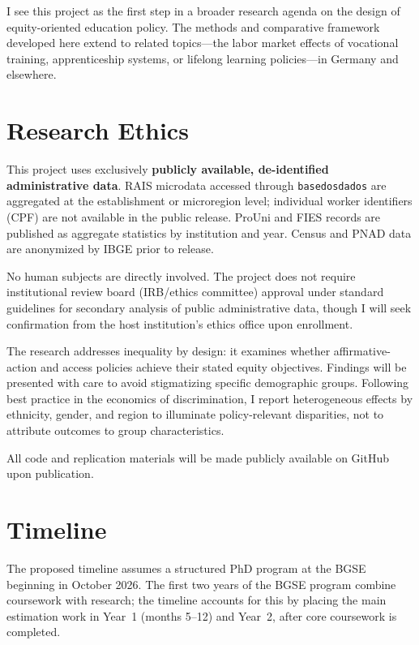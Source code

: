 \documentclass[a4paper,11pt]{article}
\begin{document}
I see this project as the first step in a broader research agenda on the design of equity-oriented education policy. The methods and comparative framework developed here extend to related topics---the labor market effects of vocational training, apprenticeship systems, or lifelong learning policies---in Germany and elsewhere.

\section{Research Ethics}

This project uses exclusively \textbf{publicly available, de-identified administrative data}. RAIS microdata accessed through \texttt{basedosdados} are aggregated at the establishment or microregion level; individual worker identifiers (CPF) are not available in the public release. ProUni and FIES records are published as aggregate statistics by institution and year. Census and PNAD data are anonymized by IBGE prior to release.

No human subjects are directly involved. The project does not require institutional review board (IRB/ethics committee) approval under standard guidelines for secondary analysis of public administrative data, though I will seek confirmation from the host institution's ethics office upon enrollment.

The research addresses inequality by design: it examines whether affirmative-action and access policies achieve their stated equity objectives. Findings will be presented with care to avoid stigmatizing specific demographic groups. Following best practice in the economics of discrimination, I report heterogeneous effects by ethnicity, gender, and region to illuminate policy-relevant disparities, not to attribute outcomes to group characteristics.

All code and replication materials will be made publicly available on GitHub upon publication.

\section{Timeline}

The proposed timeline assumes a structured PhD program at the BGSE beginning in October 2026. The first two years of the BGSE program combine coursework with research; the timeline accounts for this by placing the main estimation work in Year~1 (months 5--12) and Year~2, after core coursework is completed.
\end{document}
